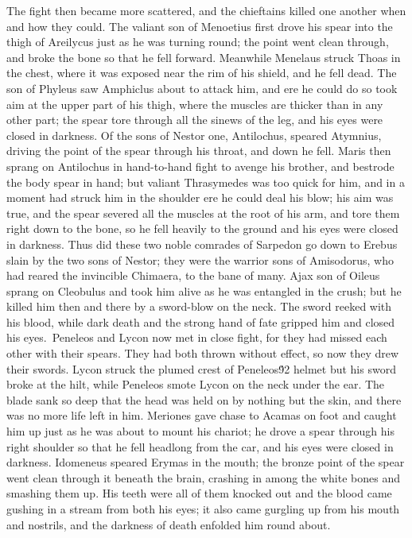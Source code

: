 {The fight then became more scattered, and the chieftains killed one another when and how they could. The valiant son of Menoetius first drove his spear into the thigh of Areilycus just as he was turning round; the point went clean through, and broke the bone so that he fell forward. Meanwhile Menelaus struck Thoas in the chest, where it was exposed near the rim of his shield, and he fell dead. The son of Phyleus saw Amphiclus about to attack him, and ere he could do so took aim at the upper part of his thigh, where the muscles are thicker than in any other part; the spear tore through all the sinews of the leg, and his eyes were closed in darkness. Of the sons of Nestor one, Antilochus, speared Atymnius, driving the point of the spear through his throat, and down he fell. Maris then sprang on Antilochus in hand-to-hand fight to avenge his brother, and bestrode the body spear in hand; but valiant Thrasymedes was too quick for him, and in a moment had struck him in the shoulder ere he could deal his blow; his aim was true, and the spear severed all the muscles at the root of his arm, and tore them right down to the bone, so he fell heavily to the ground and his eyes were closed in darkness. Thus did these two noble comrades of Sarpedon go down to Erebus slain by the two sons of Nestor; they were the warrior sons of Amisodorus, who had reared the invincible Chimaera, to the bane of many. Ajax son of Oileus sprang on Cleobulus and took him alive as he was entangled in the crush; but he killed him then and there by a sword-blow on the neck. The sword reeked with his blood, while dark death and the strong hand of fate gripped him and closed his eyes.\
Peneleos and Lycon now met in close fight, for they had missed each other with their spears. They had both thrown without effect, so now they drew their swords. Lycon struck the plumed crest of Peneleos\'92 helmet but his sword broke at the hilt, while Peneleos smote Lycon on the neck under the ear. The blade sank so deep that the head was held on by nothing but the skin, and there was no more life left in him. Meriones gave chase to Acamas on foot and caught him up just as he was about to mount his chariot; he drove a spear through his right shoulder so that he fell headlong from the car, and his eyes were closed in darkness. Idomeneus speared Erymas in the mouth; the bronze point of the spear went clean through it beneath the brain, crashing in among the white bones and smashing them up. His teeth were all of them knocked out and the blood came gushing in a stream from both his eyes; it also came gurgling up from his mouth and nostrils, and the darkness of death enfolded him round about.\
}
